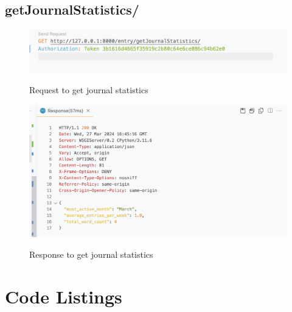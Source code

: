 \subsection{getJournalStatistics/}
\begin{figure}[H]
    \caption{Request to get journal statistics}
    \includegraphics[width=\textwidth]{Assets/api_test/request_get_journal_statistics.png}
    \label{fig:request_get_journal_statistics}
\end{figure}

\begin{figure}[H]
    \caption{Response to get journal statistics}
    \includegraphics[width=\textwidth]{Assets/api_test/response_get_journal_statistics.png}
    \label{fig:response_get_journal_statistics}
\end{figure}



\section{Code Listings}
